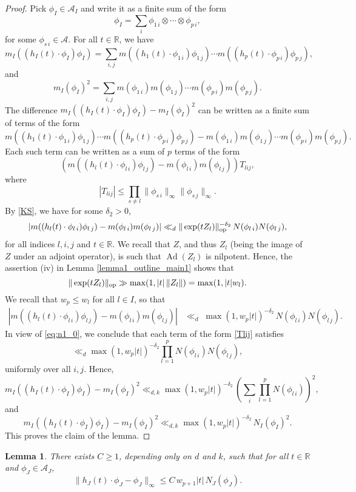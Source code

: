\documentclass[11pt,reqno,a4paper]{amsart}
\numberwithin{equation}{section}
\newcommand{\cA}{\mathcal{A}}
\DeclareMathOperator{\Ad}{Ad}
\theoremstyle{theorem}
\newtheorem{lemma}[theorem]{Lemma}
\theoremstyle{definition}
\begin{document}
\begin{proof}
Pick $\phi_I \in \cA_I$ and write it as a finite sum of the form
\[
\phi_I = \sum_i \phi_{1\,i} \otimes \cdots \otimes \phi_{p\,i},
\]
for some $\phi_{s\,i}\in\cA$.
For all $t\in \mathbb{R}$, we have
\[
m_I((h_I(t) \cdot \phi_I) \phi_I) = \sum_{i,j} m((h_1(t) \cdot \phi_{1\,i})\phi_{1\,j})  \cdots m((h_p(t) \cdot \phi_{p\,i})\phi_{p\,j}),
\]
and
\[
m_I(\phi_I)^2 = \sum_{i,j} m(\phi_{1\,i})m(\phi_{1\,j}) \cdots m(\phi_{p\,i})m(\phi_{p\,j}).
\]
The difference $m_I((h_I(t) \cdot \phi_I)\phi_I) - m_I(\phi_I)^2$ can be written as a finite sum of terms of the form
\[
m((h_1(t) \cdot \phi_{1\,i})\phi_{1\,j}) \cdots m((h_p(t) \cdot \phi_{p\,i})\phi_{p\,j})
- 
m(\phi_{1\,i})m(\phi_{1\,j}) \cdots m(\phi_{p\,i})m(\phi_{p\,j}).
\]
Each such term can be written as a sum of $p$ terms of the form
\begin{equation}
\label{Tlij}
(m((h_l(t) \cdot \phi_{l\,i})\phi_{l\,j}) - m(\phi_{l\,i})m(\phi_{l\,j}))T_{lij},
\end{equation}
where 
\[
|T_{lij}| \leq \prod_{s \neq l} \|\phi_{s\,i}\|_{\infty} \|\phi_{s\,j}\|_\infty.
\]
By \eqref{KS}, we have for some $\delta_2 > 0$,
\[
| m((h_l(t) \cdot \phi_{l\,i})\phi_{l\,j}) - m(\phi_{l\,i})m(\phi_{l\,j})| \ll_{d}  \|\exp(tZ_l)\|^{-\delta_2}_{\rm op} \, N(\phi_{l\,i})N(\phi_{l\,j}),
\]
for all indices $l,i,j$ and $t\in\mathbb{R}$. We recall that $Z$, and thus $Z_l$ (being the image of $Z$ under an adjoint operator), 
is such that $\Ad(Z_l)$ is nilpotent. Hence, the assertion (iv) in Lemma \ref{lemma1_outline_main1} shows that
\[
\|\exp(tZ_l)\|_{\rm op} \gg \max(1,|t|\, \|Z_l\|)=\max(1,|t|w_l).
\] 
We recall that $w_p \leq w_l$ for all $l \in I$, so that
\begin{align*}
| m((h_l(t) \cdot \phi_{l\,i})\phi_{l\,j}) - m(\phi_{l\,i})m(\phi_{l\,j})| &\ll_{d}
\; \max(1,w_p |t|)^{-\delta_2} \, N(\phi_{l\,i})N(\phi_{l\,j}).
\end{align*}
In view of  \eqref{eq:n1_0}, we conclude that each term of the form \eqref{Tlij} satisfies
\[
\ll_d \max(1,w_p |t|)^{-\delta_2} \prod_{l=1}^p N(\phi_{l\,i}) N(\phi_{l\,j}),
\]
uniformly over all $i,j$. Hence,
$$
m_I((h_I(t) \cdot \phi_I)\phi_I) - m_I(\phi_I)^2
\ll_{d,k} \max(1,w_p|t|)^{-\delta_2}\, \left(\sum_{i} \prod_{l=1}^p N(\phi_{l\,i})\right)^2,
$$
and
$$
m_I((h_I(t) \cdot \phi_I)\phi_I) - m_I(\phi_I)^2
\ll_{d,k} \max(1,w_p|t|)^{-\delta_2}\, N_I(\phi_I)^2.
$$
This proves the claim of the lemma.
\end{proof}

\begin{lemma}
\label{lemma3}
There exists $C \geq 1$, depending only on $d$ and $k$, such that for all $t\in\mathbb{R}$ and $\phi_J \in \cA_J$,
$$
\|h_J(t) \cdot \phi_J - \phi_J\|_\infty \leq C\, w_{p+1} |t|  \, N_J(\phi_J).
$$
\end{lemma}
\end{document}
